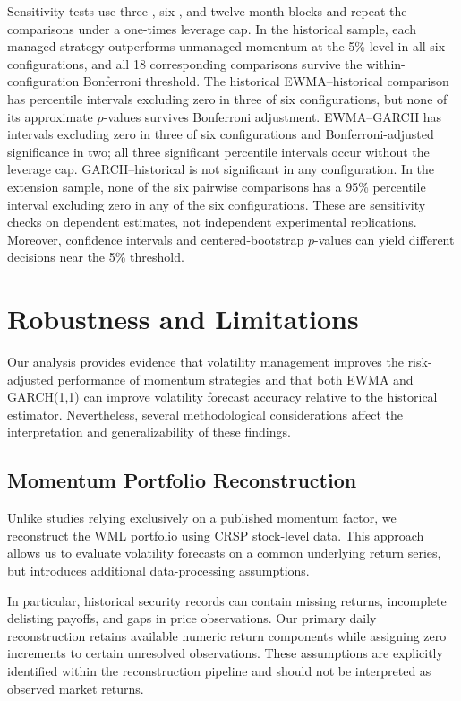 \documentclass[11pt]{article}
\begin{document}
Sensitivity tests use three-, six-, and twelve-month blocks and repeat the comparisons under a one-times leverage cap. In the historical sample, each managed strategy outperforms unmanaged momentum at the 5\% level in all six configurations, and all 18 corresponding comparisons survive the within-configuration Bonferroni threshold. The historical EWMA--historical comparison has percentile intervals excluding zero in three of six configurations, but none of its approximate $p$-values survives Bonferroni adjustment. EWMA--GARCH has intervals excluding zero in three of six configurations and Bonferroni-adjusted significance in two; all three significant percentile intervals occur without the leverage cap. GARCH--historical is not significant in any configuration. In the extension sample, none of the six pairwise comparisons has a 95\% percentile interval excluding zero in any of the six configurations. These are sensitivity checks on dependent estimates, not independent experimental replications. Moreover, confidence intervals and centered-bootstrap $p$-values can yield different decisions near the 5\% threshold.
\section{Robustness and Limitations}
\label{sec:limitations}


Our analysis provides evidence that volatility management
improves the risk-adjusted performance of momentum
strategies and that both EWMA and GARCH(1,1) can
improve volatility forecast accuracy relative to the
historical estimator. Nevertheless, several methodological
considerations affect the interpretation and
generalizability of these findings.

\subsection{Momentum Portfolio Reconstruction}

Unlike studies relying exclusively on a published
momentum factor, we reconstruct the WML portfolio
using CRSP stock-level data. This approach allows
us to evaluate volatility forecasts on a common
underlying return series, but introduces additional
data-processing assumptions.

In particular, historical security records can
contain missing returns, incomplete delisting
payoffs, and gaps in price observations.
Our primary daily reconstruction retains available
numeric return components while assigning zero
increments to certain unresolved observations.
These assumptions are explicitly identified
within the reconstruction pipeline and should
not be interpreted as observed market returns.
\end{document}
